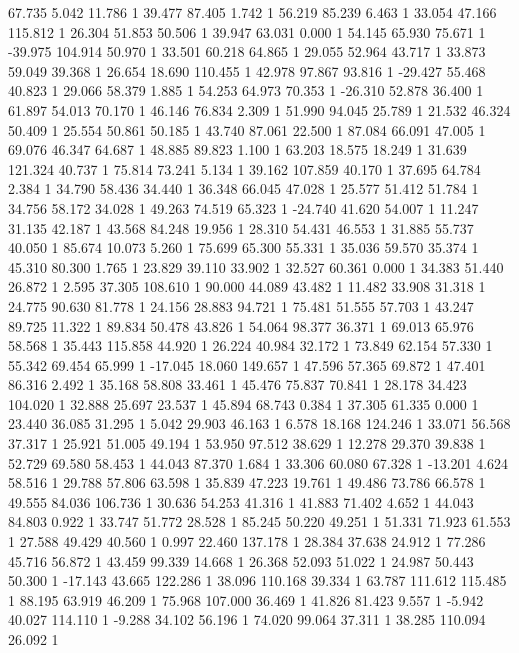 	67.735 5.042 11.786 1
	39.477 87.405 1.742 1
	56.219 85.239 6.463 1
	33.054 47.166 115.812 1
	26.304 51.853 50.506 1
	39.947 63.031 0.000 1
	54.145 65.930 75.671 1
	-39.975 104.914 50.970 1
	33.501 60.218 64.865 1
	29.055 52.964 43.717 1
	33.873 59.049 39.368 1
	26.654 18.690 110.455 1
	42.978 97.867 93.816 1
	-29.427 55.468 40.823 1
	29.066 58.379 1.885 1
	54.253 64.973 70.353 1
	-26.310 52.878 36.400 1
	61.897 54.013 70.170 1
	46.146 76.834 2.309 1
	51.990 94.045 25.789 1
	21.532 46.324 50.409 1
	25.554 50.861 50.185 1
	43.740 87.061 22.500 1
	87.084 66.091 47.005 1
	69.076 46.347 64.687 1
	48.885 89.823 1.100 1
	63.203 18.575 18.249 1
	31.639 121.324 40.737 1
	75.814 73.241 5.134 1
	39.162 107.859 40.170 1
	37.695 64.784 2.384 1
	34.790 58.436 34.440 1
	36.348 66.045 47.028 1
	25.577 51.412 51.784 1
	34.756 58.172 34.028 1
	49.263 74.519 65.323 1
	-24.740 41.620 54.007 1
	11.247 31.135 42.187 1
	43.568 84.248 19.956 1
	28.310 54.431 46.553 1
	31.885 55.737 40.050 1
	85.674 10.073 5.260 1
	75.699 65.300 55.331 1
	35.036 59.570 35.374 1
	45.310 80.300 1.765 1
	23.829 39.110 33.902 1
	32.527 60.361 0.000 1
	34.383 51.440 26.872 1
	2.595 37.305 108.610 1
	90.000 44.089 43.482 1
	11.482 33.908 31.318 1
	24.775 90.630 81.778 1
	24.156 28.883 94.721 1
	75.481 51.555 57.703 1
	43.247 89.725 11.322 1
	89.834 50.478 43.826 1
	54.064 98.377 36.371 1
	69.013 65.976 58.568 1
	35.443 115.858 44.920 1
	26.224 40.984 32.172 1
	73.849 62.154 57.330 1
	55.342 69.454 65.999 1
	-17.045 18.060 149.657 1
	47.596 57.365 69.872 1
	47.401 86.316 2.492 1
	35.168 58.808 33.461 1
	45.476 75.837 70.841 1
	28.178 34.423 104.020 1
	32.888 25.697 23.537 1
	45.894 68.743 0.384 1
	37.305 61.335 0.000 1
	23.440 36.085 31.295 1
	5.042 29.903 46.163 1
	6.578 18.168 124.246 1
	33.071 56.568 37.317 1
	25.921 51.005 49.194 1
	53.950 97.512 38.629 1
	12.278 29.370 39.838 1
	52.729 69.580 58.453 1
	44.043 87.370 1.684 1
	33.306 60.080 67.328 1
	-13.201 4.624 58.516 1
	29.788 57.806 63.598 1
	35.839 47.223 19.761 1
	49.486 73.786 66.578 1
	49.555 84.036 106.736 1
	30.636 54.253 41.316 1
	41.883 71.402 4.652 1
	44.043 84.803 0.922 1
	33.747 51.772 28.528 1
	85.245 50.220 49.251 1
	51.331 71.923 61.553 1
	27.588 49.429 40.560 1
	0.997 22.460 137.178 1
	28.384 37.638 24.912 1
	77.286 45.716 56.872 1
	43.459 99.339 14.668 1
	26.368 52.093 51.022 1
	24.987 50.443 50.300 1
	-17.143 43.665 122.286 1
	38.096 110.168 39.334 1
	63.787 111.612 115.485 1
	88.195 63.919 46.209 1
	75.968 107.000 36.469 1
	41.826 81.423 9.557 1
	-5.942 40.027 114.110 1
	-9.288 34.102 56.196 1
	74.020 99.064 37.311 1
	38.285 110.094 26.092 1
